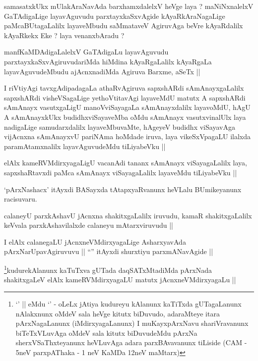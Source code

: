 \begin{artha}
samasatxkUkx mUlakAraNavAda barxhamxdalelxV heVge laya ? maNiNxnalelxV GaTAdigaLige layavAguvudu parxtayxkaSxvAgide kAyaRkAraNagaLige paMcaBUtagaLalilx layaveMbudu saMmataveV AgiruvAga beVre kAyaRdalilx kAyaRkekx Eke ? laya venanxbAradu ?
\end{artha}

\begin{artha}
manfKaMDAdigaLalelxV GaTAdigaLu layavAguvudu parxtayxkaSxvAgiruvudariMda hiMdina kAyaRgaLalilx kAyaRgaLa layavAguvudeMbudu ajAcnxnadiMda Agiruva Barxme, aSeTx ||
\end{artha}

\begin{artha}
I riVtiyAgi tavxgAdipadagaLa athaRvAgiruva sapxshARdi sAmAnayxgaLalilx sapxshARdi visheVSagaLige yethoVtitavAgi layaveMdU matutx A sapxshARdi sAmAnayx vasutxgaLigU manoVviSayagaLa sAmAnayxdalilx layavoMdU, hAgU A sAmAnayxkUkx budidhxviSayaveMba oMdu sAmAnayx vasutxvinalUlx laya nadigaLige samudarxdalilx layaveMbuvaMte, hAgeyeV budidhx viSayavAga vijAcnxna sAmAnayxvU pariNAma hoMdade iruva, laya vikeSxVpagaLU ilalxda paramAtamxnalilx layavAguvudeMdu tiLiyabeVku || 
\end{artha}

\begin{artha}
elAlx kameRVMdirxyagaLigU vacanAdi tananx sAmAnayx viSayagaLalilx laya, sapxshaRtavxdi paMca sAmAnayx viSayagaLalilx layaveMdu tiLiyabeVku ||
\end{artha}

\begin{artha}
`pArxNashacx' itAyxdi BASayxda tAtapxyaRvanunx heVLalu BUmikeyanunx racisuvaru.
\end{artha}

\begin{artha}
calaneyU parxkAshavU jAcnxna shakitxgaLalilx iruvudu, kamaR shakitxgaLalilx keVvala parxkAshavilalxde calaneyu mAtarxviruvudu ||
\end{artha}


\begin{artha}
I elAlx calanegaLU jAcnxneVMdirxyagaLige AsharxyavAda pArxNarUpavAgiruvuvu || ``\stext'' itAyxdi shurxtiyu parxmANavAgide ||
\end{artha}

\begin{artha}
\footnote[1]{`\stext' || eMdu `\stext' - oLeLx jAtiya kudureyu kAlanunx kaTiTxda gUTagaLanunx nAlakxnunx oMdeV sala heVge kitutx biDuvudo, adaraMteye itara pArxNagaLanunx (iMdirxyagaLanunx) I muKayxpArxNavu shariVravanunx biTeTxVLuvAga oMdeV sala kitutx biDuvudeMdu pArxNa sherxVSaThxteyanunx heVLuvAga adara parxBAvavanunx tiLiside (CAM - 5neV parxpAThaka - 1 neV KaMDa 12neV maMtarx)}kudurekAlanunx kaTuTxva gUTada daqSATxMtadiMda pArxNada shakitxgaLeV elAlx kameRVMdirxyagaLU matutx jAcnxneVMdirxyagaLu ||
\end{artha}

